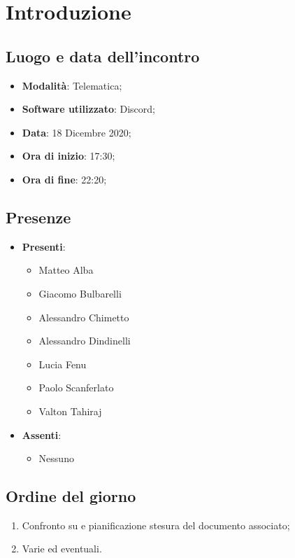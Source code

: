 \documentclass[]{article}
\begin{document}
	
	
	
	\newpage
	
	\section{Introduzione}
		\subsection{Luogo e data dell'incontro}
		\begin{itemize}
			\item \textbf{Modalità}: Telematica;
			\item \textbf{Software utilizzato}: Discord;
			\item \textbf{Data}: 18 Dicembre 2020;
			\item \textbf{Ora di inizio}: 17:30;
			\item \textbf{Ora di fine}: 22:20;
		\end{itemize}

		\subsection{Presenze}
		\begin{itemize}
			\item \textbf{Presenti}:
			\begin{itemize}
				\item Matteo Alba
				\item Giacomo Bulbarelli
				\item Alessandro Chimetto
				\item Alessandro Dindinelli
				\item Lucia Fenu
				\item Paolo Scanferlato
				\item Valton Tahiraj
			\end{itemize}
			\item \textbf{Assenti}:
			\begin{itemize}
				\item Nessuno
			\end{itemize}
		\end{itemize}


		\subsection{Ordine del giorno}
		\begin{enumerate}
			\item Confronto su  e pianificazione stesura del documento associato;
			\item Varie ed eventuali.
		\end{enumerate}
\end{document}
